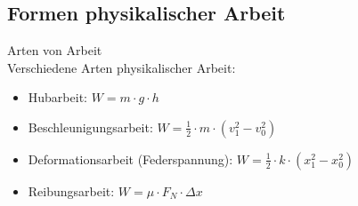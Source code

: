 \subsection{Formen physikalischer Arbeit}
\begin{concept}{Arten von Arbeit}\\
    Verschiedene Arten physikalischer Arbeit:
    \begin{itemize}
        \item Hubarbeit: $W = m \cdot g \cdot h$
        \item Beschleunigungsarbeit: $W = \frac{1}{2} \cdot m \cdot (v_1^2 - v_0^2)$
        \item Deformationsarbeit (Federspannung): $W = \frac{1}{2} \cdot k \cdot (x_1^2 - x_0^2)$
        \item Reibungsarbeit: $W = \mu \cdot F_N \cdot \Delta x$
    \end{itemize}
\end{concept}

